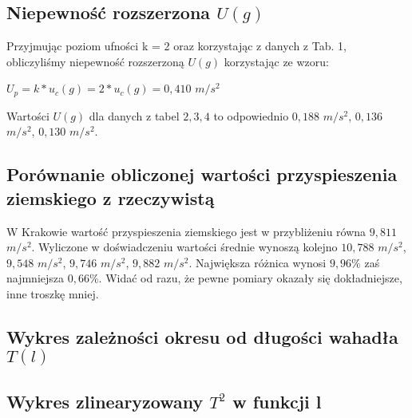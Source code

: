 \documentclass[12pt]{article}
\begin{document}
\subsection{Niepewność rozszerzona $U(g)$}
Przyjmując poziom ufności k = 2 oraz korzystając z danych z Tab. 1, obliczyliśmy niepewność rozszerzoną $U(g)$ korzystając ze wzoru:
\begin{center}
\LARGE $ U_p = k * u_c(g) = 2 * u_c(g) = 0,410 $ $m/s^2  $
\end{center}
Wartości $U(g)$ dla danych z tabel $2,3,4$ to odpowiednio $0,188$ $m/s^2$, $0,136$ $m/s^2$, $0,130$ $m/s^2$.
\subsection{Porównanie obliczonej wartości przyspieszenia ziemskiego z rzeczywistą}
W Krakowie wartość przyspieszenia ziemskiego jest w przybliżeniu równa $9,811$ $m/s^2$. Wyliczone w doświadczeniu wartości średnie wynoszą kolejno $10,788 $ $m/s^2$, $9,548 $ $m/s^2$, $9,746 $ $m/s^2$, $9,882 $ $m/s^2$. Największa różnica wynosi $9,96\%$ zaś najmniejsza $0,66\%$. Widać od razu, że pewne pomiary okazały się dokładniejsze, inne troszkę mniej.
\subsection{Wykres zależności okresu od długości wahadła $T(l)$}

\subsection{Wykres zlinearyzowany $T^2$ w funkcji l}
\end{document}

